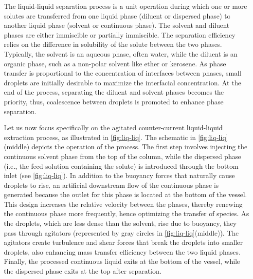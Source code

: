 The liquid-liquid separation process is a unit operation during which one or more solutes are transferred from one liquid phase (diluent or dispersed phase) to another liquid phase (solvent or continuous phase).
The solvent and diluent phases are either immiscible or partially immiscible.
The separation efficiency relies on the difference in solubility of the solute between the two phases.
Typically, the solvent is an aqueous phase, often water, while the diluent is an organic phase, such as a non-polar solvent like ether or kerosene.
As phase transfer is proportional to the concentration of interfaces between phases, small droplets are initially desirable to maximize the interfacial concentration.
At the end of the process, separating the diluent and solvent phases becomes the priority, thus, coalescence between droplets is promoted to enhance phase separation.

Let us now focus specifically on the agitated counter-current liquid-liquid extraction process, as illustrated in \ref{fig:liq-liq}. 
The schematic in \ref{fig:liq-liq} (middle) depicts the operation of the process.
The first step involves injecting the continuous solvent phase from the top of the column, while the dispersed phase (i.e., the feed solution containing the solute) is introduced through the bottom inlet (see \ref{fig:liq-liq}). 
In addition to the buoyancy forces that naturally cause droplets to rise, an artificial downstream flow of the continuous phase is generated because the outlet for this phase is located at the bottom of the vessel. 
This design increases the relative velocity between the phases, thereby renewing the continuous phase more frequently, hence optimizing the transfer of species.
As the droplets, which are less dense than the solvent, rise due to buoyancy, they pass through agitators (represented by gray circles in \ref{fig:liq-liq}(middle)). 
The agitators create turbulence and shear forces that break the droplets into smaller droplets, also enhancing mass transfer efficiency between the two liquid phases. 
Finally, the processed continuous liquid exits at the bottom of the vessel, while the dispersed phase exits at the top after separation. 

